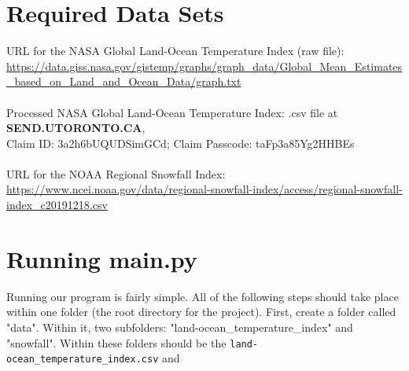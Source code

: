 \documentclass[fontsize=11pt]{article}
\begin{document}
\section*{Required Data Sets}

URL for the NASA Global Land-Ocean Temperature Index (raw file): \url{https://data.giss.nasa.gov/gistemp/graphs/graph_data/Global_Mean_Estimates_based_on_Land_and_Ocean_Data/graph.txt}\\
\\
Processed NASA Global Land-Ocean Temperature Index: .csv file at \textbf{ SEND.UTORONTO.CA}, \\Claim ID: 3a2h6bUQUDSimGCd; Claim Passcode: taFp3a85Yg2HHBEs\\
\\
URL for the NOAA Regional Snowfall Index: 
\url{https://www.ncei.noaa.gov/data/regional-snowfall-index/access/regional-snowfall-index_c20191218.csv}

\section*{Running main.py}
Running our program is fairly simple. All of the following steps should take place within one folder (the root directory for the project). First, create a folder called "data". Within it, two subfolders: "land-ocean\_temperature\_index" and "snowfall". Within these folders should be the \texttt{land-ocean\_temperature\_index.csv} and 
\end{document}
